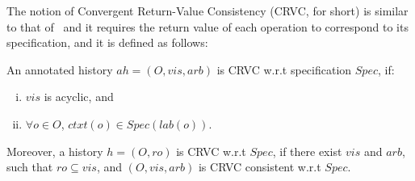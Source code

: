 The notion of Convergent Return-Value Consistency (CRVC, for short) is
similar to that of~\cite{Burckhardt:2014} and it requires the return
value of each operation to correspond to its specification, and it is
defined as follows:

\begin{definition}
\label{definition:strong return value consistency}
An annotated history $ah = (O,\mathit{vis},\mathit{arb})$ is CRVC w.r.t specification $\mathit{Spec}$, if:
\begin{enumerate}[(i)]
\item $\mathit{vis}$ is acyclic, and
\item $\forall o \in O$, $\mathit{ctxt}(o) \in Spec(\mathit{lab}(o))$.
\end{enumerate}

Moreover, a history $h = (O,\mathit{ro})$ is CRVC w.r.t $\mathit{Spec}$, if
there exist $\mathit{vis}$ and $\mathit{arb}$, such that $\mathit{ro}
\subseteq \mathit{vis}$, and $(O,\mathit{vis},\mathit{arb})$ is CRVC
consistent w.r.t $\mathit{Spec}$.
\end{definition}


